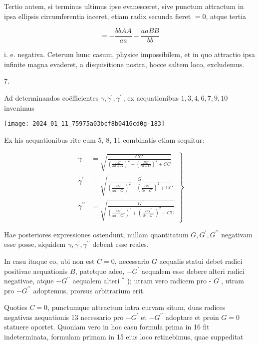 \documentclass[10pt]{article}
\begin{document}
Tertio autem, si terminus ultimus ipse evanesceret, sive punctum attractum in ipsa ellipsis circumferentia iaceret, etiam radix secunda fieret \(=0\), atque tertia

\[
=-\frac{b b A A}{a a}-\frac{a a B B}{b b}
\]

i. e. negativa. Ceterum hunc casum, physice impossibilem, et in quo attractio ipsa infinite magna evaderet, a disquisitione nostra, hocce saltem loco, excludemus.

7.

Ad determinandos coëfficientes \(\gamma, \gamma^{\prime}, \gamma^{\prime \prime}\), ex aequationibus \(1,3,4,6,7,9,10\) invenimus

\begin{center}
\texttt{[image: 2024\_01\_11\_75975a03bcf8b0416cd0g-183]}
\end{center}

Ex his aequationibus rite cum 5, 8, 11 combinatis etiam sequitur:

\[
\left.\begin{array}{rl}
\gamma & =\sqrt{\frac{G G}{\left(\frac{A G}{a a+G}\right)^{2}+\left(\frac{B G}{b b+G}\right)^{2}+C C}} \\
\gamma^{\prime} & =\sqrt{\frac{G^{\prime}}{\left(\frac{A G^{\prime}}{a a-G^{\prime}}\right)^{2}+\left(\frac{B G^{\prime}}{b b-G^{\prime}}\right)^{2}+C C}} \\
\gamma^{\prime \prime} & =\sqrt{\frac{G^{\prime \prime}}{\left(\frac{A G^{\prime \prime}}{a a-G^{\prime \prime}}\right)^{2}+\left(\frac{B G^{\prime \prime}}{b b-G^{\prime \prime}}\right)^{2}+C C}}
\end{array}\right\}
\]

Hae posteriores expressiones ostendunt, nullam quantitatum \(G, G^{\prime}, G^{\prime \prime}\) negativam esse posse, siquidem \(\gamma, \gamma^{\prime}, \gamma^{\prime \prime}\) debent esse reales.

In casu itaque eo, ubi non est \(C=0\), necessario \(G\) aequalis statui debet radici positivae aequationis \(B\), patetque adeo, \(-G^{\prime}\) aequalem esse debere alteri radici negativae, atque \(-G^{\prime \prime}\) aequalem alteri \({ }^{*}\) ); utram vero radicem pro - \(G^{\prime}\), utram pro \(-G^{\prime \prime}\) adoptemus, prorsus arbitrarium erit.

Quoties \(C=0\), punctumque attractum intra curvam situm, duas radices negativas aequationis 13 necessario pro \(-G^{\prime}\) et \(-G^{\prime \prime}\) adoptare et proin \(G=0\) statuere oportet. Quoniam vero in hoc casu formula prima in 16 fit indeterminata, formulam primam in 15 eius loco retinebimus, quae suppeditat
\end{document}
